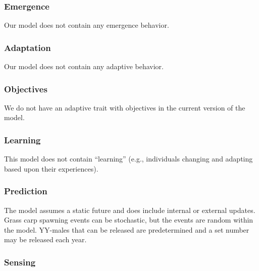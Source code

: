 \documentclass{article}[12pt]
\begin{document}
\subsubsection{Emergence}

Our model does not contain any emergence behavior.

\subsubsection{Adaptation}

Our model does not contain any adaptive behavior.

\subsubsection{Objectives}

We do not have an adaptive trait with objectives in the current version of the model.

\subsubsection{Learning}

This model does not contain ``learning'' (e.g., individuals changing and adapting based upon their experiences). 

\subsubsection{Prediction}

The model assumes a static future and does include internal or external updates. 
Grass carp spawning events can be stochastic, but the events are random within the model.
YY-males that can be released are predetermined and a set number may be released each year.


\subsubsection{Sensing}
\end{document}
